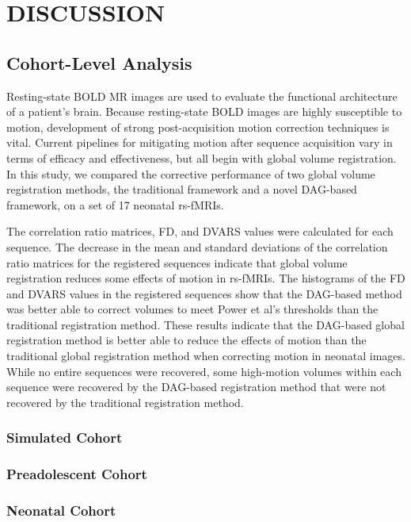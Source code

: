 \chapter{DISCUSSION}
\label{ch:discussion}

\section{Cohort-Level Analysis}

Resting-state BOLD MR images are used to evaluate the functional architecture of a patient's brain. Because resting-state BOLD images are highly susceptible to motion, development of strong post-acquisition motion correction techniques is vital. Current pipelines for mitigating motion after sequence acquisition vary in terms of efficacy and effectiveness, but all begin with global volume registration. In this study, we compared the corrective performance of two global volume registration methods, the traditional framework and a novel DAG-based framework, on a set of 17 neonatal rs-fMRIs. 

The correlation ratio matrices, FD, and DVARS values were calculated for each sequence. The decrease in the mean and standard deviations of the correlation ratio matrices for the registered sequences indicate that global volume registration reduces some effects of motion in rs-fMRIs. The histograms of the FD and DVARS values in the registered sequences show that the DAG-based method was better able to correct volumes to meet Power et al’s thresholds than the traditional registration method. These results indicate that the DAG-based global registration method is better able to reduce the effects of motion than the traditional global registration method when correcting motion in neonatal images. While no entire sequences were recovered, some high-motion volumes within each sequence were recovered by the DAG-based registration method that were not recovered by the traditional registration method. 

\subsection{Simulated Cohort}

\subsection{Preadolescent Cohort}

\subsection{Neonatal Cohort}

